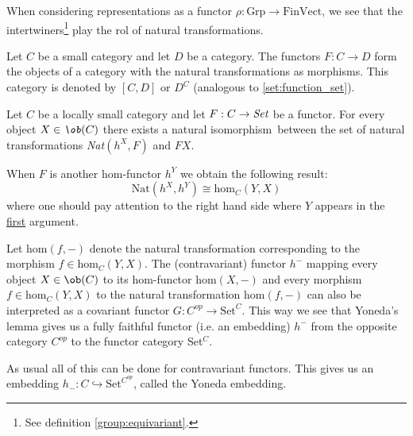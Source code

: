 	\begin{example}
	        When considering representations as a functor $\rho:\text{Grp}\rightarrow\text{FinVect}$, we see that the intertwiners\footnote{See definition \ref{group:equivariant}.} play the rol of natural transformations.
	\end{example}
	\begin{example}
		Let $C$ be a small category and let $D$ be a category. The functors $F:C\rightarrow D$ form the objects of a category with the natural transformations as morphisms. This category is denoted by $[C, D]$ or $D^C$ (analogous to \ref{set:function_set}).
	\end{example}
	
	
	\begin{theorem}
		Let $C$ be a locally small category and let $F:C\rightarrow\emph{Set}$ be a functor. For every object $X\in\emph\ob(C)$ there exists a natural isomorphism\footnotemark\ between the set of natural transformations \emph{Nat}$(h^X, F)$ and $FX$.
	\end{theorem}
	\begin{result}
		When $F$ is another hom-functor $h^Y$ we obtain the following result:
		\begin{equation}
			\text{Nat}(h^X, h^Y)\cong\text{hom}_C(Y, X)
		\end{equation}
		where one should pay attention to the right hand side where $Y$ appears in the \underline{first} argument.
		
		Let $\text{hom}(f, -)$ denote the natural transformation corresponding to the morphism $f\in\text{hom}_C(Y,X)$. The (contravariant) functor $h^-$ mapping every object $X\in\ob(C)$ to its hom-functor hom$(X, -)$ and every morphism $f\in\text{hom}_C(Y, X)$ to the natural transformation hom$(f, -)$ can also be interpreted as a covariant functor $G:C^{op}\rightarrow\text{Set}^C$. This way we see that Yoneda's lemma gives us a fully faithful functor (i.e. an embedding) $h^-$ from the opposite category $C^{op}$ to the functor category Set$^C$.
		
		As usual all of this can be done for contravariant functors. This gives us an embedding $h_-:C\hookrightarrow\text{Set}^{C^{op}}$, called the Yoneda embedding. 
	\end{result}

